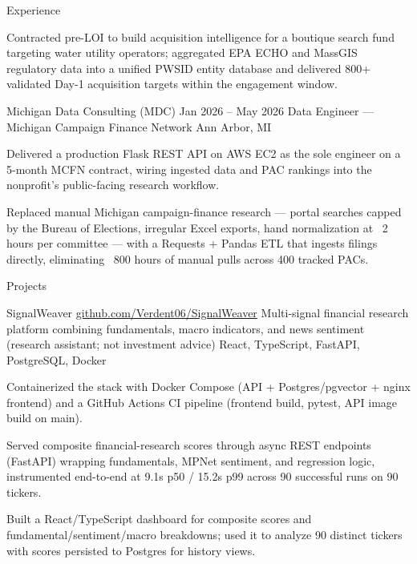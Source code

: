 \documentclass[
	11pt
]{../../../template}
\begin{document}
\begin{rSection}{E}{xperience}
\begin{rSectionEntry}
			\item Contracted pre-LOI to build acquisition intelligence for a boutique search fund targeting water utility operators; aggregated EPA ECHO and MassGIS regulatory data into a unified PWSID entity database and delivered 800+ validated Day-1 acquisition targets within the engagement window.
		\end{rSectionEntry}

		\begin{rSectionEntry}
			{Michigan Data Consulting (MDC)}
			{Jan 2026 -- May 2026}
			{Data Engineer --- Michigan Campaign Finance Network}
			{}
			{Ann Arbor, MI}

			\item Delivered a production Flask REST API on AWS EC2 as the sole engineer on a 5-month MCFN contract, wiring ingested data and PAC rankings into the nonprofit's public-facing research workflow.
			\item Replaced manual Michigan campaign-finance research --- portal searches capped by the Bureau of Elections, irregular Excel exports, hand normalization at ~2 hours per committee --- with a Requests + Pandas ETL that ingests filings directly, eliminating ~800 hours of manual pulls across 400 tracked PACs.
		\end{rSectionEntry}
	\end{rSection}

	\begin{rSection}{P}{rojects}
		\begin{rSectionEntry}
			{SignalWeaver}
			{\href{https://github.com/Verdent06/SignalWeaver}{github.com/Verdent06/SignalWeaver}}
			{Multi-signal financial research platform combining fundamentals, macro indicators, and news sentiment (research assistant; not investment advice)}
			{React, TypeScript, FastAPI, PostgreSQL, Docker}
			{}

			\item Containerized the stack with Docker Compose (API + Postgres/pgvector + nginx frontend) and a GitHub Actions CI pipeline (frontend build, pytest, API image build on main).
			\item Served composite financial-research scores through async REST endpoints (FastAPI) wrapping fundamentals, MPNet sentiment, and regression logic, instrumented end-to-end at 9.1s p50 / 15.2s p99 across 90 successful runs on 90 tickers.
			\item Built a React/TypeScript dashboard for composite scores and fundamental/sentiment/macro breakdowns; used it to analyze 90 distinct tickers with scores persisted to Postgres for history views.
		\end{rSectionEntry}

	\end{rSection}
\end{document}
